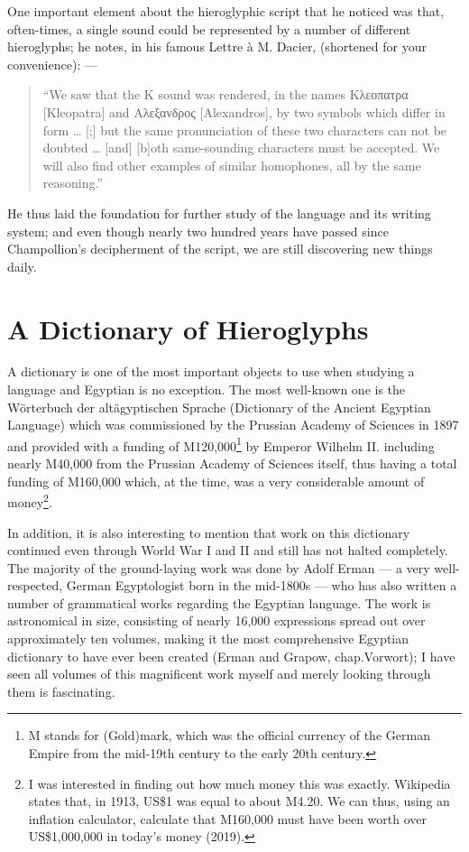 \documentclass[a5paper,twoside,11pt]{report}
\begin{document}
	One important element about the hieroglyphic script that he noticed was that, often-times, a single sound could be represented by a number of different hieroglyphs; he notes, in his famous Lettre à M. Dacier, (shortened for your convenience): —

	\begin{quote}
		“We saw that the K sound was rendered, in the names Κλεοπατρα [Kleopatra] and Aλεξανδρος [Alexandros], by two symbols which differ in form … [;] but the same pronunciation of these two characters can not be doubted … [and] [b]oth same-sounding characters must be accepted. We will also find other examples of similar homophones, all by the same reasoning.” \parencite[p. 5]{lettre}
	\end{quote}

	He thus laid the foundation for further study of the language and its writing system; and even though nearly two hundred years have passed since Champollion’s decipherment of the script, we are still discovering new things daily.

\chapter*{A Dictionary of Hieroglyphs}

  A dictionary is one of the most important objects to use when studying a language and Egyptian is no exception. The most well-known one is the Wörterbuch der altägyptischen Sprache (Dictionary of the Ancient Egyptian Language) which was commissioned by the Prussian Academy of Sciences in 1897 and provided with a funding of M120,000\footnote{M stands for (Gold)mark, which was the official currency of the German Empire from the mid-19th century to the early 20th century.} by Emperor Wilhelm II. including nearly M40,000 from the Prussian Academy of Sciences itself, thus having a total funding of M160,000 which, at the time, was a very considerable amount of money\footnote{I was interested in finding out how much money this was exactly. Wikipedia states that, in 1913, US\$1 was equal to about M4.20. We can thus, using an inflation calculator, calculate that M160,000 must have been worth over US\$1,000,000 in today’s money (2019).}.

	In addition, it is also interesting to mention that work on this dictionary continued even through World War I and II and still has not halted completely. The majority of the ground-laying work was done by Adolf Erman — a very well-respected, German Egyptologist born in the mid-1800s — who has also written a number of grammatical works regarding the Egyptian language. The work is astronomical in size, consisting of nearly 16,000 expressions spread out over approximately ten volumes, making it the most comprehensive Egyptian dictionary to have ever been created (Erman and Grapow, chap.Vorwort); I have seen all volumes of this magnificent work myself and merely looking through them is fascinating.
\end{document}
